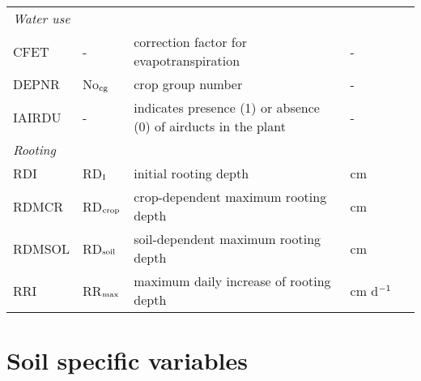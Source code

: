 \begin{longtable}[c]{
       p{0.1\linewidth}p{0.1\linewidth}p{0.6\linewidth}p{0.2\linewidth}
       }
\multicolumn{4}{l}{\textit{Water use}}\\
CFET & - & correction factor for evapotranspiration    &   -\\
DEPNR & No$_{{\rm cg}}$ & crop group number   &    -\\
IAIRDU & - & indicates presence (1) or absence (0) of airducts in the plant &   -\\

\multicolumn{4}{l}{\textit{Rooting}}\\
RDI & RD$_{{\rm I}}$ & initial rooting depth   &    cm\\
RDMCR & RD$_{{\rm crop}}$ & crop-dependent maximum rooting depth    &   cm\\
RDMSOL & RD$_{{\rm soil}}$ & soil-dependent maximum rooting depth   &    cm\\
RRI & RR$_{{\rm max}}$ & maximum daily increase of rooting depth   &    cm d$^{{\rm -1}}$\\

\hline \hline
                      
\end{longtable}
\normalfont
 
\section*{Soil specific variables}

